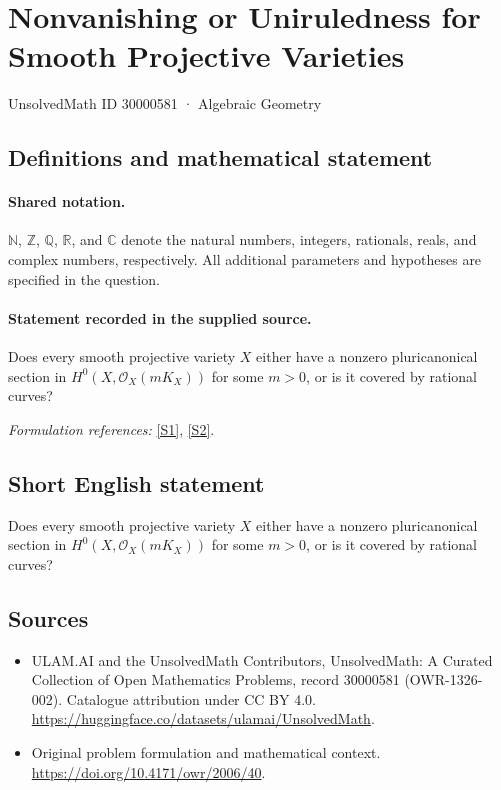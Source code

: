 \documentclass[11pt]{article}
\newcommand{\sref}[2]{\hyperlink{source:#1:#2}{[S#2]}}
\begin{document}
\setcounter{section}{30000580}
\section{Nonvanishing or Uniruledness for Smooth Projective Varieties}\label{30000581}
{\small UnsolvedMath ID 30000581 · Algebraic Geometry}
\subsection{Definitions and mathematical statement}

\paragraph{Shared notation.}$\mathbb N$, $\mathbb Z$, $\mathbb Q$, $\mathbb R$, and $\mathbb C$ denote the natural numbers, integers, rationals, reals, and complex numbers, respectively. All additional parameters and hypotheses are specified in the question.


\paragraph{Statement recorded in the supplied source.}
Does every smooth projective variety $X$ either have a nonzero pluricanonical section in $H^0(X,\mathcal O_X(mK_X))$ for some $m>0$, or is it covered by rational curves?
\par\smallskip\textit{Formulation references:} \sref{30000581}{1}, \sref{30000581}{2}.
\subsection{Short English statement}
Does every smooth projective variety $X$ either have a nonzero pluricanonical section in $H^0(X,\mathcal O_X(mK_X))$ for some $m>0$, or is it covered by rational curves?
\subsection{Sources}
\begin{itemize}
\item[\hypertarget{source:30000581:1}{S1}] ULAM.AI and the UnsolvedMath Contributors, UnsolvedMath: A Curated Collection of Open Mathematics Problems, record 30000581 (OWR-1326-002). Catalogue attribution under CC BY 4.0.
\url{https://huggingface.co/datasets/ulamai/UnsolvedMath}.
\item[\hypertarget{source:30000581:2}{S2}] Original problem formulation and mathematical context.
\url{https://doi.org/10.4171/owr/2006/40}.
\end{itemize}
\label{end:30000581}
\end{document}
